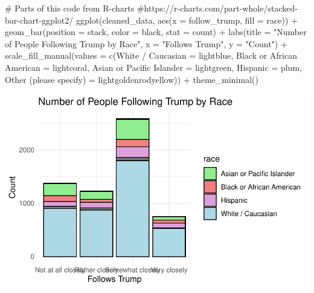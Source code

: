 \documentclass[
  letterpaper,
  DIV=11,
  numbers=noendperiod]{scrartcl}
\newenvironment{Shaded}{\begin{snugshade}}{\end{snugshade}}
\newcommand{\AttributeTok}[1]{\textcolor[rgb]{0.40,0.45,0.13}{#1}}
\newcommand{\CommentTok}[1]{\textcolor[rgb]{0.37,0.37,0.37}{#1}}
\newcommand{\FunctionTok}[1]{\textcolor[rgb]{0.28,0.35,0.67}{#1}}
\newcommand{\NormalTok}[1]{\textcolor[rgb]{0.00,0.23,0.31}{#1}}
\newcommand{\OtherTok}[1]{\textcolor[rgb]{0.00,0.23,0.31}{#1}}
\newcommand{\SpecialCharTok}[1]{\textcolor[rgb]{0.37,0.37,0.37}{#1}}
\newcommand{\StringTok}[1]{\textcolor[rgb]{0.13,0.47,0.30}{#1}}
\begin{document}
\begin{Shaded}
\begin{Highlighting}[]
\CommentTok{\# Parts of this code from R{-}charts}
\CommentTok{\#https://r{-}charts.com/part{-}whole/stacked{-}bar{-}chart{-}ggplot2/}
\FunctionTok{ggplot}\NormalTok{(cleaned\_data, }\FunctionTok{aes}\NormalTok{(}\AttributeTok{x =}\NormalTok{ follow\_trump, }\AttributeTok{fill =}\NormalTok{ race)) }\SpecialCharTok{+}
  \FunctionTok{geom\_bar}\NormalTok{(}\AttributeTok{position =} \StringTok{\textquotesingle{}stack\textquotesingle{}}\NormalTok{, }\AttributeTok{color =} \StringTok{\textquotesingle{}black\textquotesingle{}}\NormalTok{, }\AttributeTok{stat =} \StringTok{\textquotesingle{}count\textquotesingle{}}\NormalTok{) }\SpecialCharTok{+}
  \FunctionTok{labs}\NormalTok{(}\AttributeTok{title =} \StringTok{"Number of People Following Trump by Race"}\NormalTok{,}
       \AttributeTok{x =} \StringTok{"Follows Trump"}\NormalTok{,}
       \AttributeTok{y =} \StringTok{"Count"}\NormalTok{) }\SpecialCharTok{+}
  \FunctionTok{scale\_fill\_manual}\NormalTok{(}\AttributeTok{values =} \FunctionTok{c}\NormalTok{(}\StringTok{\textquotesingle{}White / Caucasian\textquotesingle{}} \OtherTok{=} \StringTok{\textquotesingle{}lightblue\textquotesingle{}}\NormalTok{, }\StringTok{\textquotesingle{}Black or African American\textquotesingle{}} \OtherTok{=} \StringTok{\textquotesingle{}lightcoral\textquotesingle{}}\NormalTok{, }\StringTok{\textquotesingle{}Asian or Pacific Islander\textquotesingle{}} \OtherTok{=} \StringTok{\textquotesingle{}lightgreen\textquotesingle{}}\NormalTok{, }\StringTok{\textquotesingle{}Hispanic\textquotesingle{}} \OtherTok{=} \StringTok{\textquotesingle{}plum\textquotesingle{}}\NormalTok{,}
                               \StringTok{\textquotesingle{}Other  (please specify)\textquotesingle{}} \OtherTok{=} \StringTok{\textquotesingle{}lightgoldenrodyellow\textquotesingle{}}\NormalTok{)) }\SpecialCharTok{+}
  \FunctionTok{theme\_minimal}\NormalTok{()}
\end{Highlighting}
\end{Shaded}

\includegraphics{paper_files/figure-pdf/unnamed-chunk-5-1.pdf}
\end{document}
